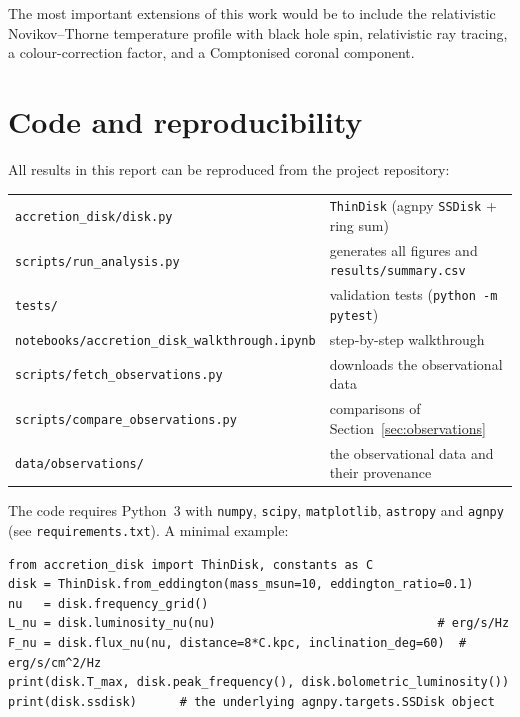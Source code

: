 \documentclass[11pt,a4paper]{article}
\begin{document}
The most important extensions of this work would be to include the
relativistic Novikov--Thorne temperature profile with black hole spin,
relativistic ray tracing, a colour-correction factor, and a Comptonised
coronal component.

\appendix
\section{Code and reproducibility}

All results in this report can be reproduced from the project repository:
\begin{center}
\small
\begin{tabular}{@{}ll@{}}
  \texttt{accretion\_disk/disk.py} & \texttt{ThinDisk} (agnpy \texttt{SSDisk} + ring sum) \\
  \texttt{scripts/run\_analysis.py} & generates all figures and \texttt{results/summary.csv} \\
  \texttt{tests/} & validation tests (\texttt{python -m pytest}) \\
  \texttt{notebooks/accretion\_disk\_walkthrough.ipynb} & step-by-step walkthrough \\
  \texttt{scripts/fetch\_observations.py} & downloads the observational data \\
  \texttt{scripts/compare\_observations.py} & comparisons of Section~\ref{sec:observations} \\
  \texttt{data/observations/} & the observational data and their provenance \\
\end{tabular}
\end{center}
The code requires Python~3 with \texttt{numpy}, \texttt{scipy},
\texttt{matplotlib}, \texttt{astropy} and \texttt{agnpy} (see
\texttt{requirements.txt}). A minimal example:
\begin{verbatim}
from accretion_disk import ThinDisk, constants as C
disk = ThinDisk.from_eddington(mass_msun=10, eddington_ratio=0.1)
nu   = disk.frequency_grid()
L_nu = disk.luminosity_nu(nu)                               # erg/s/Hz
F_nu = disk.flux_nu(nu, distance=8*C.kpc, inclination_deg=60)  # erg/s/cm^2/Hz
print(disk.T_max, disk.peak_frequency(), disk.bolometric_luminosity())
print(disk.ssdisk)      # the underlying agnpy.targets.SSDisk object
\end{verbatim}



\end{document}
